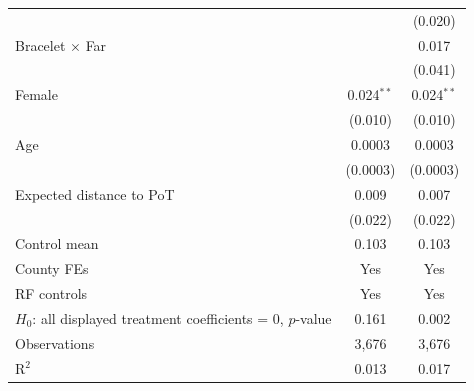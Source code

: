 {\begin{tabular}{lcc}
                                                              &              & (0.020)\\   
   Bracelet $\times$ Far                                      &              & 0.017\\   
                                                              &              & (0.041)\\   
   \addlinespace[0.4em]
   Female                                                     & 0.024$^{**}$ & 0.024$^{**}$\\   
                                                              & (0.010)      & (0.010)\\   
   Age                                                        & 0.0003       & 0.0003\\   
                                                              & (0.0003)     & (0.0003)\\   
   Expected distance to PoT                                   & 0.009        & 0.007\\   
                                                              & (0.022)      & (0.022)\\   
   Control mean                                               & 0.103        & 0.103\\  
   County FEs                                                 & Yes          & Yes\\  
   RF controls                                                & Yes          & Yes\\  
   $H_0$: all displayed treatment coefficients = 0, $p$-value & 0.161        & 0.002\\  
   \midrule
   Observations                                               & 3,676        & 3,676\\  
   R$^2$                                                      & 0.013        & 0.017\\  
   \midrule \midrule
\end{tabular}}


